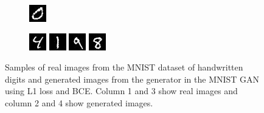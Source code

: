 \documentclass[12pt, fleqn, titlepage]{article}
\newcommand\skipperer{0.45pt}
\newcommand\ripperer{1.25pt}
\begin{document}
\begin{figure}[H]
\begin{subfigure}[b]{0.7\textwidth}
		\hskip\skipperer
		\includegraphics[width=0.22\linewidth]{imgs/MNIST_GAN_normal_fake_5}
	\end{subfigure}
	\vskip\ripperer
	\begin{subfigure}[b]{0.7\textwidth}
		\centering
		\includegraphics[width=0.22\linewidth]{imgs/MNIST_GAN_normal_real_6}
		\hskip\skipperer
		\includegraphics[width=0.22\linewidth]{imgs/MNIST_GAN_normal_fake_6}
		\hskip\skipperer
		\includegraphics[width=0.22\linewidth]{imgs/MNIST_GAN_normal_real_7}
		\hskip\skipperer
		\includegraphics[width=0.22\linewidth]{imgs/MNIST_GAN_normal_fake_7}
	\end{subfigure}
	\caption{Samples of real images from the MNIST dataset of handwritten digits and generated images from the generator in the MNIST GAN using L1 loss and BCE. Column 1 and 3 show real images and column 2 and 4 show generated images.}
	\label{fig:generated_images_MNIST_GAN_normal}
\end{figure}
\end{document}
